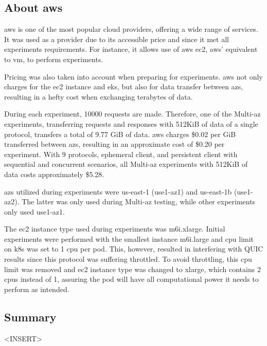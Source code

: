 \subsection{About \gls{aws}}

\gls{aws} is one of the most popular cloud providers, offering a wide range of services. It was used as a provider due to its accessible price and since it met all experiments requirements. For instance, it allows use of \gls{aws} \gls{ec2}, \gls{aws}’ equivalent to \gls{vm}, to perform experiments.

Pricing was also taken into account when preparing for experiments. \gls{aws} not only charges for the \gls{ec2} instance and \gls{eks}, but also for data transfer between \gls{az}s, resulting in a hefty cost when exchanging terabytes of data.

During each experiment, 10000 requests are made. Therefore, one of the Multi-\gls{az} experiments, transferring requests and responses with 512KiB of data of a single protocol, transfers a total of 9.77 GiB of data. \gls{aws} charges \$0.02 per GiB transferred between \gls{az}s, resulting in an approximate cost of \$0.20 per experiment. With 9 protocols, ephemeral client, and persistent client with sequential and concurrent scenarios, all Multi-\gls{az} experiments with 512KiB of data costs approximately \$5.28.

\gls{az}s utilized during experiments were us-east-1 (use1-az1) and us-east-1b (use1-az2). The latter was only used during Multi-\gls{az} testing, while other experiments only used use1-az1.

The \gls{ec2} instance type used during experiments was m6i.xlarge. Initial experiments were performed with the smallest instance m6i.large and \gls{cpu} limit on \gls{k8s} was set to 1 \gls{cpu} per pod. This, however, resulted in interfering with QUIC results since this protocol was suffering throttled. To avoid throttling, this \gls{cpu} limit was removed and \gls{ec2} instance type was changed to xlarge, which contains 2 \gls{cpu}s instead of 1, assuring the pod will have all computational power it needs to perform as intended.

\subsection{Summary}

<INSERT>
